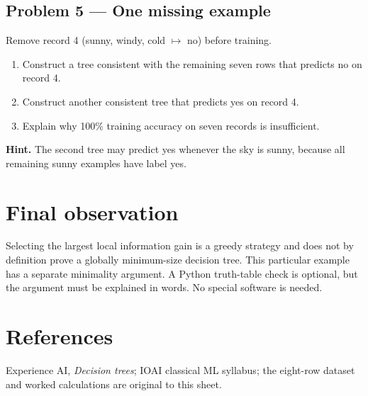 \documentclass[11pt,a4paper]{article}
\newcommand{\problem}[1]{\subsection*{Problem #1}}
\begin{document}
\problem{5 --- One missing example}
Remove record 4 (sunny, windy, cold $\mapsto$ no) before training.
\begin{enumerate}[label=(\alph*)]
\item Construct a tree consistent with the remaining seven rows that predicts no on record 4.
\item Construct another consistent tree that predicts yes on record 4.
\item Explain why 100\% training accuracy on seven records is insufficient.
\end{enumerate}
\textbf{Hint.} The second tree may predict yes whenever the sky is sunny, because all remaining sunny examples have label yes.

\section*{Final observation}
Selecting the largest local information gain is a greedy strategy and does not by definition prove a globally minimum-size decision tree. This particular example has a separate minimality argument. A Python truth-table check is optional, but the argument must be explained in words. No special software is needed.

\section*{References}
Experience AI, \emph{Decision trees}; IOAI classical ML syllabus; the eight-row dataset and worked calculations are original to this sheet.
\end{document}
